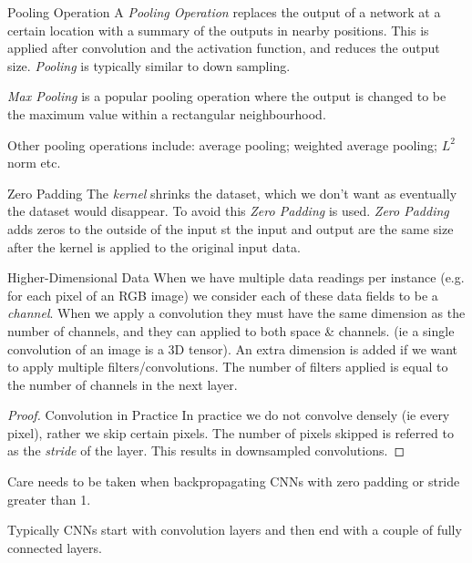 \documentclass[11pt,a4paper]{article}
\begin{document}
\begin{definition}{Pooling Operation}
  A \textit{Pooling Operation} replaces the output of a network at a certain location with a summary of the outputs in nearby positions. This is applied after convolution and the activation function, and reduces the output size. \textit{Pooling} is typically similar to down sampling.
  \par \textit{Max Pooling} is a popular pooling operation where the output is changed to be the maximum value within a rectangular neighbourhood.
  \par Other pooling operations include: average pooling; weighted average pooling; $L^2$ norm etc.
\end{definition}

\begin{proposition}{Zero Padding}
  The \textit{kernel} shrinks the dataset, which we don't want as eventually the dataset would disappear. To avoid this \textit{Zero Padding} is used. \textit{Zero Padding} adds zeros to the outside of the input st the input and output are the same size after the kernel is applied to the original input data.
\end{proposition}

\begin{proposition}{Higher-Dimensional Data}
  When we have multiple data readings per instance (e.g. for each pixel of an RGB image) we consider each of these data fields to be a \textit{channel}. When we apply a convolution they must have the same dimension as the number of channels, and they can applied to both space \& channels. (ie a single convolution of an image is a 3D tensor). An extra dimension is added if we want to apply multiple filters/convolutions. The number of filters applied is equal to the number of channels in the next layer.
\end{proposition}

\begin{proof}{Convolution in Practice}
  In practice we do not convolve densely (ie every pixel), rather we skip certain pixels. The number of pixels skipped is referred to as the \textit{stride} of the layer. This results in downsampled convolutions.
\end{proof}

\begin{remark}{Care needs to be taken when backpropagating CNNs with zero padding or stride greater than 1.}\end{remark}

\begin{remark}{Typically CNNs start with convolution layers and then end with a couple of fully connected layers.}\end{remark}
\end{document}
